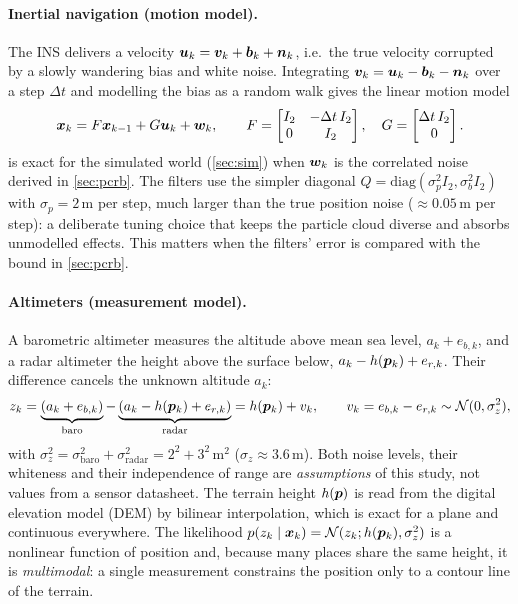 \paragraph{Inertial navigation (motion model).}
The INS delivers a velocity $\bm{u}_k = \bm{v}_k + \bm{b}_k + \bm{n}_k$, i.e.\ the true
velocity corrupted by a slowly wandering bias and white noise. Integrating
$\bm{v}_k = \bm{u}_k - \bm{b}_k - \bm{n}_k$ over a step $\Delta t$ and modelling the bias as a
random walk gives the linear motion model
\begin{equation}
  \bm{x}_k = F\bm{x}_{k-1} + G\bm{u}_k + \bm{w}_k,\qquad
  F = \begin{bmatrix} I_2 & -\Delta t\, I_2 \\ 0 & I_2 \end{bmatrix},\quad
  G = \begin{bmatrix} \Delta t\, I_2 \\ 0 \end{bmatrix}.
  \label{eq:motion}
\end{equation}
 is exact for the simulated world (\cref{sec:sim}) when $\bm{w}_k$ is the
correlated noise derived in \cref{sec:pcrb}. The filters use the simpler diagonal
$Q = \mathrm{diag}(\sigma_p^2 I_2, \sigma_b^2 I_2)$ with $\sigma_p = 2$\,m per step, much
larger than the true position noise ($\approx 0.05$\,m per step): a deliberate tuning choice
that keeps the particle cloud diverse and absorbs unmodelled effects. This matters when the
filters' error is compared with the bound in \cref{sec:pcrb}.

\paragraph{Altimeters (measurement model).}
A barometric altimeter measures the altitude above mean sea level, $a_k + e_{b,k}$, and a radar
altimeter the height above the surface below, $a_k - h(\bm{p}_k) + e_{r,k}$. Their difference
cancels the unknown altitude $a_k$:
\begin{equation}
  z_k = \underbrace{(a_k + e_{b,k})}_{\text{baro}} - \underbrace{(a_k - h(\bm{p}_k) + e_{r,k})}_{\text{radar}}
      = h(\bm{p}_k) + v_k,\qquad v_k = e_{b,k} - e_{r,k} \sim \mathcal{N}(0, \sigma_z^2),
  \label{eq:meas}
\end{equation}
with $\sigma_z^2 = \sigma_{\mathrm{baro}}^2 + \sigma_{\mathrm{radar}}^2 = 2^2 + 3^2$\,m$^2$
($\sigma_z \approx 3.6$\,m). Both noise levels, their whiteness and their independence of
range are \emph{assumptions} of this study, not values from a sensor datasheet. The terrain
height $h(\bm{p})$ is read from the digital elevation model (DEM) by bilinear interpolation, which
is exact for a plane and continuous everywhere. The likelihood $p(z_k \mid \bm{x}_k) =
\mathcal{N}(z_k; h(\bm{p}_k), \sigma_z^2)$ is a nonlinear function of position and, because many places
share the same height, it is \emph{multimodal}: a single measurement constrains the position
only to a contour line of the terrain.

